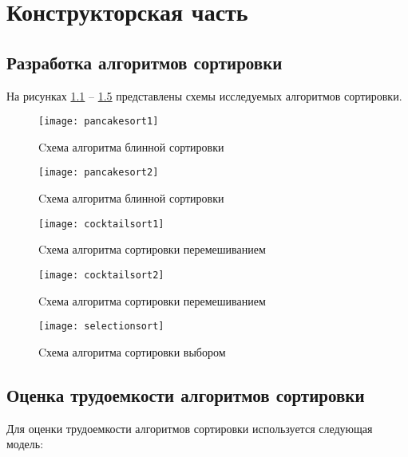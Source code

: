 \chapter{Конструкторская часть}

\section{Разработка алгоритмов сортировки}

На рисунках \ref{pss1} -- \ref{sss} представлены схемы исследуемых алгоритмов сортировки.

\begin{figure}[h]
	\centering
	\texttt{[image: pancakesort1]}
	\caption{Cхема алгоритма блинной сортировки}
	\label{pss1}
\end{figure}

\begin{figure}[h]
	\centering
	\texttt{[image: pancakesort2]}
	\caption{Cхема алгоритма блинной сортировки}
	\label{pss2}
\end{figure}

\begin{figure}[h]
	\centering
	\texttt{[image: cocktailsort1]}
	\caption{Cхема алгоритма сортировки перемешиванием}
	\label{css1}
\end{figure}

\begin{figure}[h]
	\centering
	\texttt{[image: cocktailsort2]}
	\caption{Cхема алгоритма сортировки перемешиванием}
	\label{css2}
\end{figure}

\begin{figure}[h]
	\centering
	\texttt{[image: selectionsort]}
	\caption{Cхема алгоритма сортировки выбором}
	\label{sss}
\end{figure}

\section{Оценка трудоемкости алгоритмов сортировки}

Для оценки трудоемкости алгоритмов сортировки используется следующая модель:

